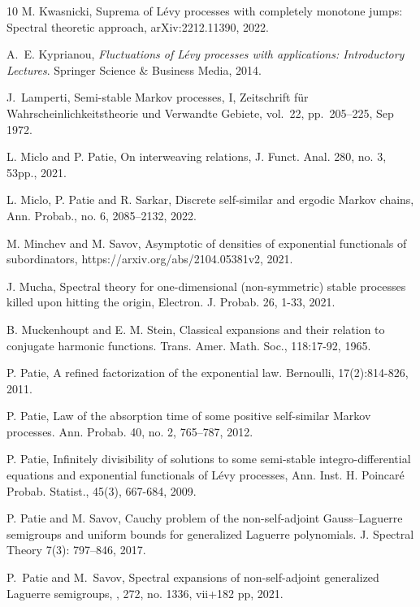 \documentclass[12pt]{amsart}
\numberwithin{equation}{section}
\theoremstyle{definition}
\theoremstyle{assump}
\theoremstyle{remark}
\begin{document}
{\begin{thebibliography}{10}
M. Kwasnicki, Suprema of L\'evy processes with completely monotone jumps: Spectral theoretic approach, 	arXiv:2212.11390, 2022.

A.~E. Kyprianou, {\em Fluctuations of L{\'e}vy processes with applications:
  Introductory Lectures}.
\newblock Springer Science \& Business Media, 2014.


J.~Lamperti,  Semi-stable Markov processes, I,  { Zeitschrift f{\"u}r
  Wahrscheinlichkeitstheorie und Verwandte Gebiete}, vol.~22, pp.~205--225, Sep
  1972.


L. Miclo  and P. Patie, On interweaving relations,   J. Funct. Anal. 280, no. 3, 53pp., 2021.


L. Miclo, P. Patie and R. Sarkar, Discrete self-similar and ergodic Markov chains,   Ann. Probab., no. 6, 2085–2132, 2022.

M. Minchev and M. Savov, Asymptotic of densities of exponential functionals of subordinators,   https://arxiv.org/abs/2104.05381v2, 2021.

J. Mucha, Spectral theory for one-dimensional (non-symmetric) stable processes killed upon hitting the origin,
 Electron. J. Probab. 26, 1-33, 2021.

B. Muckenhoupt and E. M. Stein, Classical expansions and their relation to conjugate harmonic functions.
Trans. Amer. Math. Soc., 118:17-92, 1965.


P. Patie, A refined factorization of the exponential law. Bernoulli, 17(2):814-826, 2011.

P. Patie, Law of the absorption time of some positive self-similar Markov processes. Ann. Probab. 40, no. 2, 765--787, 2012.

P. Patie,  Infinitely divisibility of solutions to some semi-stable integro-differential equations
and exponential functionals of L\'evy processes, Ann. Inst. H. Poincar\'e Probab. Statist., 45(3), 667-684, 2009.


 P. Patie and M. Savov, Cauchy problem of the non-self-adjoint Gauss–Laguerre semigroups
and uniform bounds for generalized Laguerre polynomials. J. Spectral Theory 7(3):
797–846, 2017.

P.~Patie and M.~Savov,  Spectral expansions of non-self-adjoint generalized
  Laguerre semigroups,
, 272, no. 1336, vii+182 pp, 2021.




\end{thebibliography}}
\end{document}
